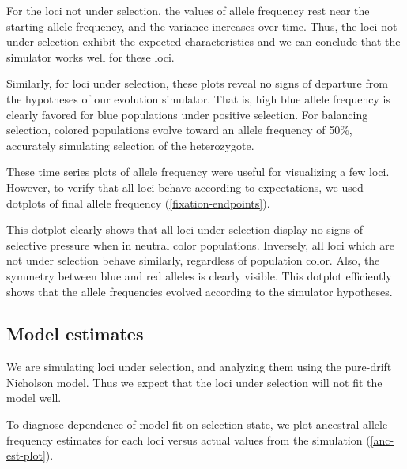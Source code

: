 \documentclass[a4paper,12pt]{article}
\begin{document}
For the loci not under selection, the values of allele frequency rest
near the starting allele frequency, and the variance increases over
time. Thus, the loci not under selection exhibit the expected
characteristics and we can conclude that the simulator works well for
these loci.

Similarly, for loci under selection, these plots reveal no signs of
departure from the hypotheses of our evolution simulator. That is,
high blue allele frequency is clearly favored for blue populations
under positive selection. For balancing selection, colored populations
evolve toward an allele frequency of 50\%, accurately simulating
selection of the heterozygote.

These time series plots of allele frequency were useful for
visualizing a few loci. However, to verify that all loci behave
according to expectations, we used dotplots of final allele frequency
(\autoref{fixation-endpoints}).


This dotplot clearly shows that all loci under selection display no
signs of selective pressure when in neutral color
populations. Inversely, all loci which are not under selection behave
similarly, regardless of population color. Also, the symmetry between
blue and red alleles is clearly visible. This dotplot efficiently
shows that the allele frequencies evolved according to the simulator
hypotheses.

\subsection{Model estimates}

We are simulating loci under selection, and analyzing them using the
pure-drift Nicholson model. Thus we expect that the loci under
selection will not fit the model well.

To diagnose dependence of model fit on selection state, we plot
ancestral allele frequency estimates for each loci versus actual
values from the simulation (\autoref{anc-est-plot}).
\end{document}
